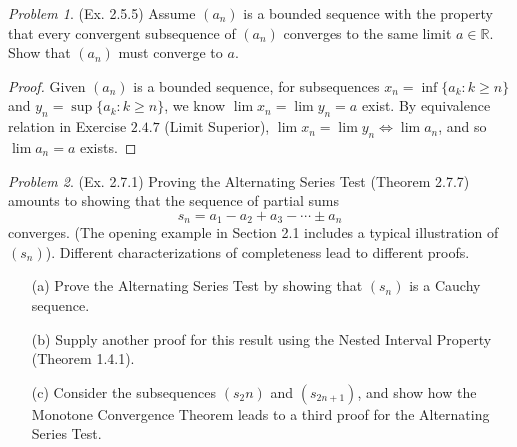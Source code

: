 \documentclass[11pt,twoside, reqno]{amsart}
\theoremstyle{remark}
\newtheorem{Prob}{Problem}
\def\R{\mathbb R}
\renewcommand{\iff}{\Leftrightarrow}
\begin{document}
\begin{Prob}(Ex. 2.5.5) Assume $(a_n)$ is a bounded sequence with the property that every convergent subsequence of $(a_n)$ converges to the same limit $a \in \R$. Show that $(a_n)$ must converge to $a$.
\end{Prob}

\begin{proof}
Given $(a_n)$ is a bounded sequence, for subsequences $x_n = \inf \{a_k : k \geq n\}$ and $y_n = \sup \{a_k : k \geq n\}$, we know $\lim x_n = \lim y_n = a$ exist. By equivalence relation in Exercise $2.4.7$ (Limit Superior), $\lim x_n = \lim y_n \iff \lim a_n$, and so $\lim a_n = a$ exists.

\end{proof}


\begin{Prob}(Ex. 2.7.1) Proving the Alternating Series Test (Theorem 2.7.7) amounts to showing that the sequence of partial sums
$$
    s_n = a_1 - a_2 + a_3 - \cdots \pm a_n
$$
converges. (The opening example in Section 2.1 includes a typical illustration of $(s_n)$). Different characterizations of completeness lead to different proofs.
\begin{enumerate}
    \item [(a)] Prove the Alternating Series Test by showing that $(s_n)$ is a Cauchy sequence.
    \item [(b)] Supply another proof for this result using the Nested Interval Property (Theorem 1.4.1).
    \item [(c)] Consider the subsequences $(s_2n)$ and $(s_{2n+1})$, and show how the Monotone Convergence Theorem leads to a third proof for the Alternating Series Test.
\end{enumerate}
\end{Prob}
\end{document}
